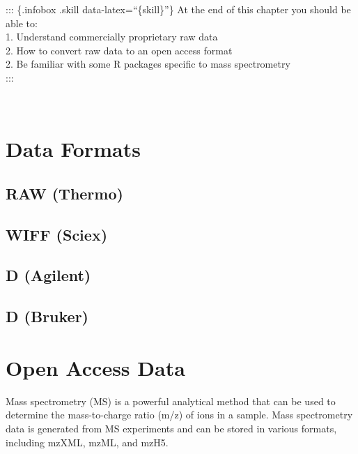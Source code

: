 \documentclass[
]{book}
\begin{document}
\hfill\break
::: \{.infobox .skill data-latex=``\{skill\}''\}
At the end of this chapter you should be able to:\\
1. Understand commercially proprietary raw data\\
2. How to convert raw data to an open access format\\
2. Be familiar with some R packages specific to mass spectrometry\\
:::\\
\strut \\

\hypertarget{data-formats}{%
\section{Data Formats}\label{data-formats}}

\hypertarget{raw-thermo}{%
\subsection*{RAW (Thermo)}\label{raw-thermo}}

\hypertarget{wiff-sciex}{%
\subsection*{WIFF (Sciex)}\label{wiff-sciex}}

\hypertarget{d-agilent}{%
\subsection*{D (Agilent)}\label{d-agilent}}

\hypertarget{d-bruker}{%
\subsection*{D (Bruker)}\label{d-bruker}}

\hypertarget{open-access-data}{%
\section{Open Access Data}\label{open-access-data}}

Mass spectrometry (MS) is a powerful analytical method that can be used to determine the mass-to-charge ratio (m/z) of ions in a sample. Mass spectrometry data is generated from MS experiments and can be stored in various formats, including mzXML, mzML, and mzH5.
\end{document}
